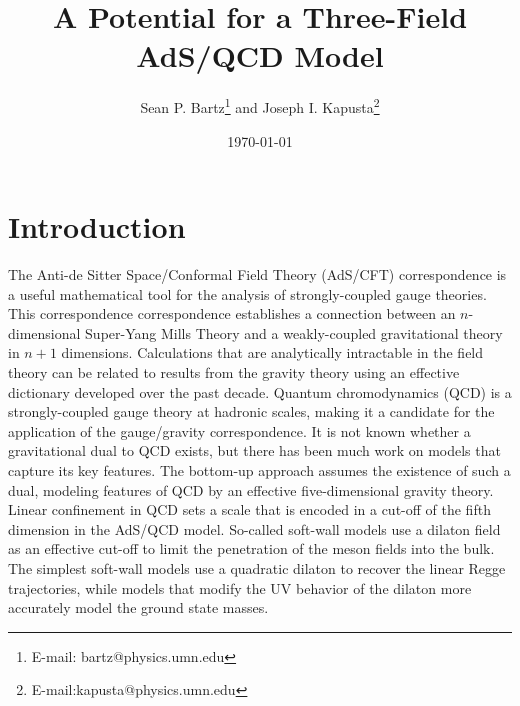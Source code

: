 \documentclass[12pt]{article}
\title{{\bf A Potential for a Three-Field AdS/QCD Model}}
\author{Sean P. Bartz\footnote{E-mail: bartz@physics.umn.edu} {\small and} Joseph I. Kapusta\footnote{E-mail:kapusta@physics.umn.edu}}
\date{\today}
\begin{document}
\maketitle

\vfill

\section{Introduction}

The Anti-de Sitter Space/Conformal Field Theory (AdS/CFT) correspondence is a useful mathematical tool for the analysis of strongly-coupled gauge theories.
This correspondence correspondence establishes a connection between an $n$-dimensional Super-Yang Mills Theory and a weakly-coupled gravitational theory in $n+1$ dimensions. 
Calculations that are analytically intractable in the field theory can be related to results from the gravity theory using an effective dictionary developed over the past decade. 
Quantum chromodynamics (QCD) is a strongly-coupled gauge theory at hadronic scales, making it a candidate for the application of the gauge/gravity correspondence.
It is not known whether a gravitational dual to QCD exists, but there has been much work on models that capture its key features.
The bottom-up approach assumes the existence of such a dual, modeling features of QCD by an effective five-dimensional gravity theory.
Linear confinement in QCD sets a scale that is encoded in a cut-off of the fifth dimension in the AdS/QCD model. 
So-called soft-wall models use a dilaton field as an effective cut-off to limit the penetration of the meson fields into the bulk. 
The simplest soft-wall models use a quadratic dilaton to recover the linear Regge trajectories, while models that modify the UV behavior of the dilaton more accurately model the ground state masses.
\end{document}
